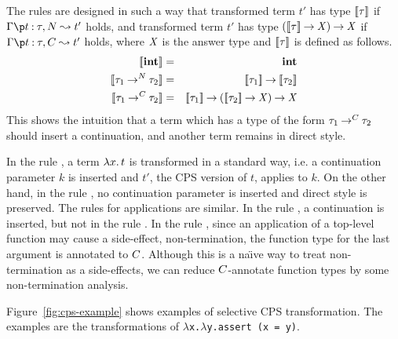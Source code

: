 The rules are designed in such a way that transformed term $t'$ has type
$[\![{\tau}]\!]$ if $\CPS{\Gamma}{t}{\tau}{N}{t'}$ holds, and transformed
term $t'$ has type ${({[\![{\tau}]\!]}\mathbin{\rightarrow}{\mathit{X}})}\mathbin{\rightarrow}{\mathit{X}}$ if
$\CPS{\Gamma}{t}{\tau}{C}{t'}$ holds, where $\mathit{X}$ is the answer type and
$[\![{\tau}]\!]$ is defined as follows.
\begin{eqnarray*}
 \CPSty{\INT} &=& \INT \\
 \CPSty{\TFunN{\tau_1}{\tau_2}} &=& \TFun{\CPSty{\tau_1}}{\CPSty{\tau_2}} \\
 \CPSty{\TFunC{\tau_1}{\tau_2}} &=& \TFun{\CPSty{\tau_1}}{\TFun{(\TFun{\CPSty{\tau_2}}{\AT})}{\AT}}
\end{eqnarray*}
This shows the intuition that a term which has a type of the form
${\tau_1}\mathbin{\rightarrow^{C}}{\tau_2}$ should insert a continuation, and another term
remains in direct style.

In the rule , a term $\lambda{x}.\,{t}$ is transformed in a
standard way, i.e. a continuation parameter $k$ is inserted and $t'$,
the CPS version of $t$, applies to $k$.  On the other hand, in the rule
, no continuation parameter is inserted and direct style is
preserved.  The rules for applications are similar. In the rule
, a continuation is inserted, but not in the rule
.  In the rule , since an application of a
top-level function may cause a side-effect, non-termination, the function
type for the last argument is annotated to $C$.
Although this is a na\"{\i}ve way to treat non-termination as a side-effects,
we can reduce $C$-annotate function types by some non-termination analysis.

Figure~\ref{fig:cps-example} shows examples of selective CPS
transformation.  The examples are the transformations of
\texttt{$\lambda$x.$\lambda$y.assert (x = y)}.

